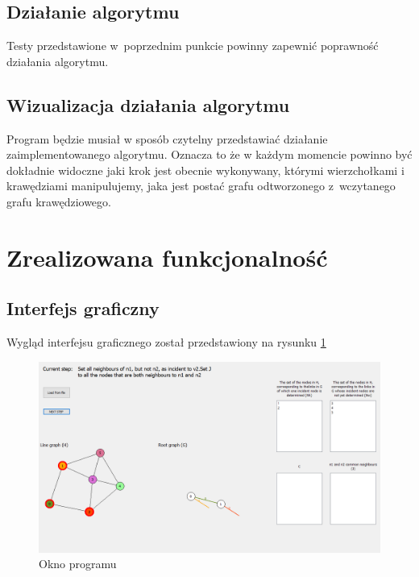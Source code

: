 \documentclass{article}
\begin{document}
\subsection{Działanie algorytmu}

Testy przedstawione w~poprzednim punkcie powinny zapewnić poprawność działania algorytmu.

\subsection{Wizualizacja działania algorytmu}

Program będzie musiał w sposób czytelny przedstawiać działanie zaimplementowanego algorytmu. Oznacza to że w każdym momencie powinno być dokładnie widoczne jaki krok jest obecnie wykonywany, którymi wierzchołkami i krawędziami manipulujemy, jaka jest postać grafu odtworzonego z~wczytanego grafu krawędziowego.

\section{Zrealizowana funkcjonalność}

\subsection{Interfejs graficzny}
Wygląd interfejsu graficznego został przedstawiony na rysunku \ref{fig:gui}

\begin{figure}[h!]
	\includegraphics[width=\linewidth]{gui_screen.png}
	\caption{Okno programu}
	\label{fig:gui}
\end{figure}
\end{document}
